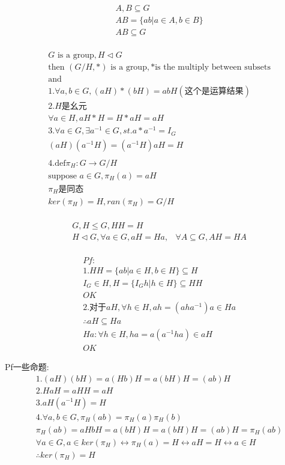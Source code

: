 \documentclass[12pt, a4paper]{article}  %
\begin{document}
\begin{align}
    &A,B\subseteq G\\
    &AB=\{ab|a\in A,b\in B\}\\
    &AB\subseteq G\\
\end{align}

\begin{align}
    &G\text{ is a group},H\lhd G\\
    &\text{then } (G/H,*)\text{ is a group},*\text{is the multiply between subsets}\\
    &\text{and }\\
    &1.\forall a,b\in G,(aH)*(bH)=abH(\text{这个是运算结果})\\
    &2.H\text{是幺元}\\
    &\forall a\in H,aH*H=H*aH=aH\\
    &3.\forall a\in G,\exists a^{-1}\in G,st. a*a^{-1}=I_G\\
    & (aH)(a^{-1}H)=(a^{-1}H)aH=H\\
    &\\
    &4.\text{def} \pi _H:G\rightarrow G/H\\
    &\text{suppose }a\in G,\pi _H(a)=aH\\
    &\pi_H\text{是同态}\\
    &ker(\pi_H)=H,ran(\pi_H)=G/H\\
\end{align}

\begin{align}
    &G,H\leqslant G,HH=H\\
    &H\lhd G,\forall a\in G,aH=Ha,
    &\forall A\subseteq G,AH=HA\\
\end{align}



\begin{align}
    &Pf:\\
    &1.HH=\{ab|a\in H,b\in H\}\subseteq H\\
    &I_G\in H,H=\{I_Gh|h\in H\}\subseteq HH\\
    &OK\\
    &2.\text{对于}aH,\forall h\in H,ah=(aha^{-1})a\in Ha\\
    &\therefore aH\subseteq Ha\\
    &Ha:\forall h\in H,ha=a(a^{-1}ha)\in aH\\
    &OK
\end{align}

Pf一些命题:
\begin{align}
    &1.(aH)(bH)=a(Hb)H=a(bH)H=(ab)H\\
    &2.HaH=aHH=aH\\
    &3.aH(a^{-1}H)=H\\
    &4.\forall a,b\in G,\pi_H(ab)=\pi_H(a)\pi_H(b)\\
    &\pi_H(ab)=aHbH=a(bH)H=a(bH)H=(ab)H=\pi_H(ab)\\
    &\forall a\in G,a\in ker(\pi_H)\leftrightarrow \pi_H(a)=H\leftrightarrow aH=H\leftrightarrow a\in H\\
    &\therefore ker(\pi_H)=H
\end{align}
\end{document}
